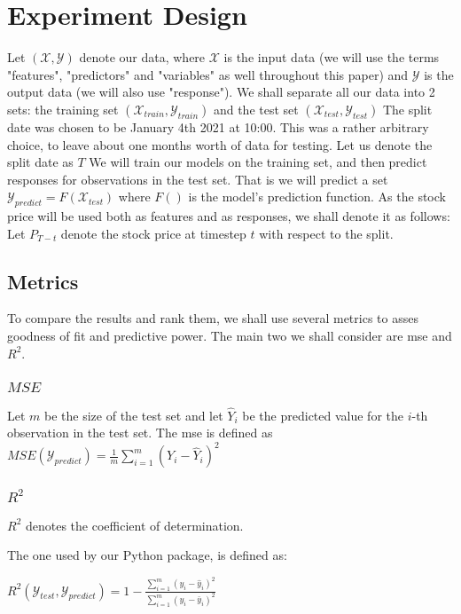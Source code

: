 \chapter{Experiment Design}
Let $(\mathcal{X},\mathcal{Y})$ denote our data, where $\mathcal{X}$ is the input data (we will use the terms "features", "predictors" and "variables" as well throughout this paper) and $\mathcal{Y}$ is the output data (we will also use "response").
We shall separate all our data into 2 sets: the training set $(\mathcal{X}_{train},\mathcal{Y}_{train})$ and the test set $(\mathcal{X}_{test},\mathcal{Y}_{test})$
The split date was chosen to be January 4th 2021 at 10:00. This was a rather arbitrary choice, to leave about one months worth of data for testing. Let us denote the split date as $T$
We will train our models on the training set, and then predict responses for observations in the test set. That is we will predict a set $\mathcal{Y}_{predict} = F(\mathcal{X}_{test})$ where $F()$ is the model's prediction function.
As the stock price will be used both as features and as responses, we shall denote it as follows:
Let $P_{T-t}$ denote the stock price at timestep $t$ with respect to the split.


\section{Metrics}

To compare the results and rank them, we shall use several metrics to asses goodness of fit and predictive power. The main two we shall consider are \acrfull{mse} and $R^2$.
\subsection{$MSE$}
Let $m$ be the size of the test set and let $\hat{Y}_i$ be the predicted value for the $i$-th observation in the test set.
The \acrlong{mse} is defined as $MSE(\mathcal{Y}_{predict}) = \frac{1}{m}\sum_{i=1}^m (Y_i - \hat{Y}_i)^2$
\subsection{$R^2$}
$R^2$ denotes the coefficient of determination.

The one used by our Python package, is defined as:

$R^2(\mathcal{Y}_{test},\mathcal{Y}_{predict}) = 1 - \frac{\sum_{i=1}^m(y_i - \hat{y}_i)^2}{\sum_{i=1}^m(y_i - \bar{y}_i)^2}$

